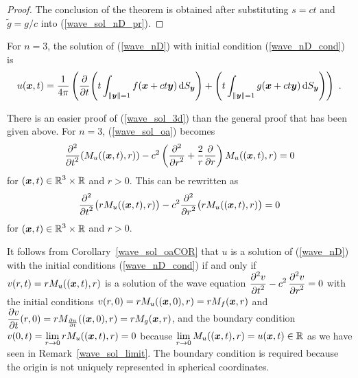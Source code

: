 \begin{proof}
The conclusion of the theorem is obtained after substituting $s=ct$
and $\tilde{g} = g/c$ into (\ref{wave_sol_nD_pr}).
\end{proof}

For $n=3$, the solution of (\ref{wave_nD}) with initial condition
(\ref{wave_nD_cond}) is
\begin{equation} \label{wave_sol_3d}
u(\VEC{x},t) = \frac{1}{4\pi}
\left( \pdfdx{
\left( t \int_{\|\VEC{y}\|=1} f(\VEC{x} + ct \VEC{y})
\dss{S}{y} \right)}{t} +
\left( t \int_{\|\VEC{y}\|=1} g(\VEC{x}+ ct \VEC{y})
\dss{S}{y} \right) \right) \ .
\end{equation}

\begin{rmk}
There is an easier proof of (\ref{wave_sol_3d}) than the general proof
that has been given above.  For $n=3$, (\ref{wave_sol_oa}) becomes
\[
\pdfdxn{ \left(M_u((\VEC{x},t),r)\right) }{t}{2}
- c^2 \left( \pdydxn{}{r}{2} + \frac{2}{r} \pdydx{}{r} \right)
M_u((\VEC{x},t),r) = 0
\]
for $\displaystyle (\VEC{x},t) \in \RR^3 \times \RR$ and $r > 0$.
This can be rewritten as
\[
\pdfdxn{ \big(rM_u((\VEC{x},t),r)\big) }{t}{2} \\
- c^2 \pdfdxn{ \big(rM_u((\VEC{x},t),r)\big)}{r}{2} = 0
\]
for $\displaystyle (\VEC{x},t) \in \RR^3 \times \RR$ and $r > 0$.

It follows from Corollary~\ref{wave_sol_oaCOR} that
$u$ is a solution of (\ref{wave_nD}) with the
initial conditions (\ref{wave_nD_cond}) if and only if
$v(r,t) = rM_u((\VEC{x},t),r)$ is a solution of the wave
equation $\displaystyle \pdydxn{v}{t}{2} - c^2\, \pdydxn{v}{r}{2} = 0$ with
the initial conditions
$\displaystyle v(r,0) = rM_u((\VEC{x},0),r) = rM_f(\VEC{x},r)$
and $\displaystyle
\pdydx{v}{t}(r,0) = rM_{\pdydx{u}{t}}((\VEC{x},0),r) = rM_g(\VEC{x},r)$,
and the boundary condition
$\displaystyle v(0,t) = \lim_{r\rightarrow 0} rM_u((\VEC{x},t),r) = 0$
because $\displaystyle \lim_{r\rightarrow 0} M_u((\VEC{x},t),r) =
u(\VEC{x},t) \in \RR$ as we have seen in Remark~\ref{wave_sol_limit}.
The boundary condition is required because the origin is not uniquely
represented in spherical coordinates.


\end{rmk}
